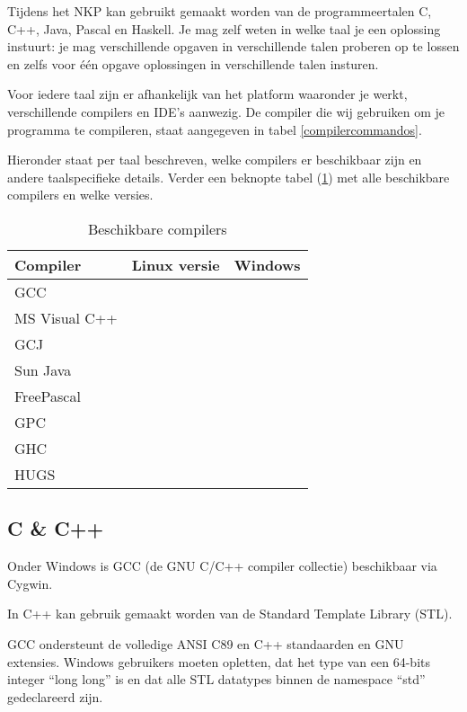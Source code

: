 \documentclass[11pt,titlepage,a4paper]{article}
\begin{document}
Tijdens het NKP kan gebruikt gemaakt worden van de programmeertalen C,
C++, Java, Pascal en Haskell. Je mag zelf weten in welke taal je een
oplossing instuurt: je mag verschillende opgaven in verschillende
talen proberen op te lossen en zelfs voor \'e\'en opgave oplossingen
in verschillende talen insturen.

Voor iedere taal zijn er afhankelijk van het platform waaronder je
werkt, verschillende compilers en IDE's aanwezig. De compiler die wij
gebruiken om je programma te compileren, staat aangegeven in tabel
\ref{compilercommandos}.

Hieronder staat per taal beschreven, welke compilers er
beschikbaar zijn en andere taalspecifieke details. Verder een beknopte
tabel (\ref{compilers}) met alle beschikbare compilers en welke versies.

\begin{table}[!ht]
\begin{center}
\caption{Beschikbare compilers}
\begin{tabular}{|l|c|c|}
\hline
Compiler & Linux versie & Windows \\
\hline
GCC				& \LINUXGCC		& \WINDOWSGCC \\
MS Visual C++	&				& \WINDOWSMSC \\
GCJ				& \LINUXGCJ		& \WINDOWSGCJ \\
Sun Java		& \LINUXJAVA	& \WINDOWSJAVA \\
FreePascal		& \LINUXFPC		& \WINDOWSFPC \\
GPC				& \LINUXGPC		& \WINDOWSGPC \\
GHC				& \LINUXGHC		& \WINDOWSGHC \\
HUGS			& \LINUXHUGS	& \WINDOWSHUGS \\
\hline
\end{tabular}
\label{compilers}
\end{center}
\end{table}


\subsection{C \& C++}

Onder Windows is GCC (de GNU C/C++ compiler collectie) beschikbaar
via Cygwin.

In C++ kan gebruik gemaakt worden van de Standard Template Library
(STL).

GCC ondersteunt de volledige ANSI C89 en C++ standaarden en GNU
extensies. Windows gebruikers moeten opletten, dat het type van een
64-bits integer ``long long'' is en dat alle STL datatypes binnen de
namespace ``std'' gedeclareerd zijn.
\end{document}
